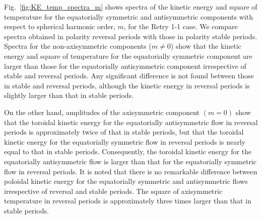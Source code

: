 {\color{red}
Fig.~\ref{fig:KE_temp_spectra_m} shows spectra of the kinetic energy and square of temperature for the equatorially symmetric and antisymmetric components
with respect to spherical harmonic order, $m$, for the Retry 1-1 case.
We compare spectra obtained in polarity reversal periods with those in polarity stable periods.
Spectra for the non-axisymmetric components ($m \ne 0$) show that the kinetic energy and square of temperature for the equatorially symmetric component are larger than those for the equatorially antisymmetric component irrespective of stable and reversal periods.
Any significant difference is not found between those in stable and reversal periods, although the kinetic energy in reversal periods is slightly larger than that in stable periods.

On the other hand, amplitudes of the axisymmetric component $(m = 0)$ show that the toroidal kinetic energy for the equatorially antisymmetric flow in reversal periods is approximately twice of that in stable periods, but that the toroidal kinetic energy for the equatorially symmetric flow in reversal periods is nearly equal to that in stable periods.
Consequently, the toroidal kinetic energy for the equatorially antisymmetric flow is larger than that for the equatorially symmetric flow in reversal periods.
It is noted that there is no remarkable difference between poloidal kinetic energy for the equatorially symmetric and antisymmetric flows irrespective of reversal and stable periods.
The square of axisymmetric temperature in reversal periods is approximately three times larger than that in stable periods.
}
